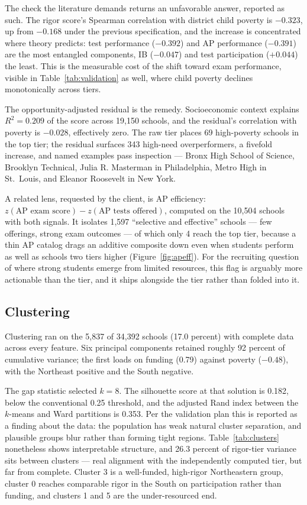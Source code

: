 \documentclass[12pt]{article}
\begin{document}
The check the literature demands returns an unfavorable answer, reported as such. The rigor score's Spearman correlation with district child poverty is $-0.323$, up from $-0.168$ under the previous specification, and the increase is concentrated where theory predicts: test performance ($-0.392$) and AP performance ($-0.391$) are the most entangled components, IB ($-0.047$) and test participation ($+0.044$) the least. This is the measurable cost of the shift toward exam performance, visible in Table~\ref{tab:validation} as well, where child poverty declines monotonically across tiers.

The opportunity-adjusted residual is the remedy. Socioeconomic context explains $R^2 = 0.209$ of the score across 19{,}150 schools, and the residual's correlation with poverty is $-0.028$, effectively zero. The raw tier places 69 high-poverty schools in the top tier; the residual surfaces 343 high-need overperformers, a fivefold increase, and named examples pass inspection --- Bronx High School of Science, Brooklyn Technical, Julia R. Masterman in Philadelphia, Metro High in St.\ Louis, and Eleanor Roosevelt in New York.

A related lens, requested by the client, is AP efficiency: $z(\text{AP exam score}) - z(\text{AP tests offered})$, computed on the 10{,}504 schools with both signals. It isolates 1{,}597 ``selective and effective'' schools --- few offerings, strong exam outcomes --- of which only 4 reach the top tier, because a thin AP catalog drags an additive composite down even when students perform as well as schools two tiers higher (Figure~\ref{fig:apeff}). For the recruiting question of where strong students emerge from limited resources, this flag is arguably more actionable than the tier, and it ships alongside the tier rather than folded into it.

\subsection{Clustering}

Clustering ran on the 5{,}837 of 34{,}392 schools (17.0 percent) with complete data across every feature. Six principal components retained roughly 92 percent of cumulative variance; the first loads on funding (0.79) against poverty ($-0.48$), with the Northeast positive and the South negative.

The gap statistic selected $k = 8$. The silhouette score at that solution is 0.182, below the conventional 0.25 threshold, and the adjusted Rand index between the $k$-means and Ward partitions is 0.353. Per the validation plan this is reported as a finding about the data: the population has weak natural cluster separation, and plausible groups blur rather than forming tight regions. Table~\ref{tab:clusters} nonetheless shows interpretable structure, and 26.3 percent of rigor-tier variance sits between clusters --- real alignment with the independently computed tier, but far from complete. Cluster 3 is a well-funded, high-rigor Northeastern group, cluster 0 reaches comparable rigor in the South on participation rather than funding, and clusters 1 and 5 are the under-resourced end.
\end{document}

